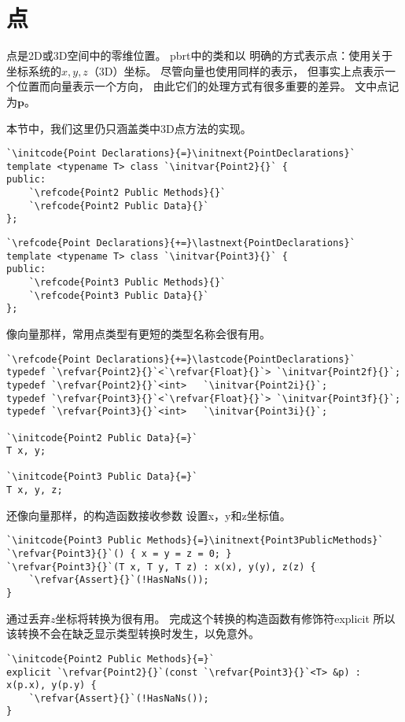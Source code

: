 \section{点}\label{sec:点}

点是2D或3D空间中的零维位置。
pbrt中的类和以
明确的方式表示点：使用关于坐标系统的$x,y,z$（3D）坐标。
尽管向量也使用同样的表示，
但事实上点表示一个位置而向量表示一个方向，
由此它们的处理方式有很多重要的差异。
文中点记为$\bm p$。

本节中，我们这里仍只涵盖类中3D点方法的实现。
\begin{lstlisting}
`\initcode{Point Declarations}{=}\initnext{PointDeclarations}`
template <typename T> class `\initvar{Point2}{}` {
public:
    `\refcode{Point2 Public Methods}{}`
    `\refcode{Point2 Public Data}{}`
};
\end{lstlisting}

\begin{lstlisting}
`\refcode{Point Declarations}{+=}\lastnext{PointDeclarations}`
template <typename T> class `\initvar{Point3}{}` {
public:
    `\refcode{Point3 Public Methods}{}`
    `\refcode{Point3 Public Data}{}`
};
\end{lstlisting}

像向量那样，常用点类型有更短的类型名称会很有用。
\begin{lstlisting}
`\refcode{Point Declarations}{+=}\lastcode{PointDeclarations}`
typedef `\refvar{Point2}{}`<`\refvar{Float}{}`> `\initvar{Point2f}{}`;
typedef `\refvar{Point2}{}`<int>   `\initvar{Point2i}{}`;
typedef `\refvar{Point3}{}`<`\refvar{Float}{}`> `\initvar{Point3f}{}`;
typedef `\refvar{Point3}{}`<int>   `\initvar{Point3i}{}`;

`\initcode{Point2 Public Data}{=}`
T x, y;

`\initcode{Point3 Public Data}{=}`
T x, y, z;
\end{lstlisting}

还像向量那样，的构造函数接收参数
设置{\ttfamily x}，{\ttfamily y}和{\ttfamily z}坐标值。
\begin{lstlisting}
`\initcode{Point3 Public Methods}{=}\initnext{Point3PublicMethods}`
`\refvar{Point3}{}`() { x = y = z = 0; }
`\refvar{Point3}{}`(T x, T y, T z) : x(x), y(y), z(z) {
    `\refvar{Assert}{}`(!HasNaNs());
}
\end{lstlisting}

通过丢弃$z$坐标将转换为很有用。
完成这个转换的构造函数有修饰符{\ttfamily explicit}
所以该转换不会在缺乏显示类型转换时发生，以免意外。
\begin{lstlisting}
`\initcode{Point2 Public Methods}{=}`
explicit `\refvar{Point2}{}`(const `\refvar{Point3}{}`<T> &p) : x(p.x), y(p.y) {
    `\refvar{Assert}{}`(!HasNaNs());
}
\end{lstlisting}

